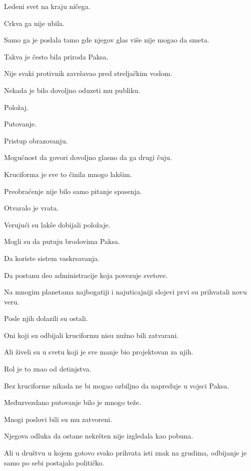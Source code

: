 Ledeni svet na kraju ničega.

Crkva ga nije ubila.

Samo ga je poslala tamo gde njegov glas više nije mogao da smeta.

\bigskip

Takva je često bila priroda Paksa.

Nije svaki protivnik završavao pred streljačkim vodom.

Nekada je bilo dovoljno oduzeti mu publiku.

Položaj.

Putovanje.

Pristup obrazovanju.

Mogućnost da govori dovoljno glasno da ga drugi čuju.

\bigskip

Kruciforma je sve to činila mnogo lakšim.

\bigskip

Preobraćenje nije bilo samo pitanje spasenja.

Otvaralo je vrata.

\bigskip

Verujući su lakše dobijali položaje.

Mogli su da putuju brodovima Paksa.

Da koriste sistem vaskrsavanja.

Da postanu deo administracije koja povezuje svetove.

Na mnogim planetama najbogatiji i najuticajniji slojevi prvi su prihvatali novu veru.

Posle njih dolazili su ostali.

\bigskip

Oni koji su odbijali kruciformu nisu nužno bili zatvarani.

Ali živeli su u svetu koji je sve manje bio projektovan za njih.

\bigskip

Rol je to znao od detinjstva.

Bez kruciforme nikada ne bi mogao ozbiljno da napreduje u vojsci Paksa.

Međuzvezdano putovanje bilo je mnogo teže.

Mnogi poslovi bili su mu zatvoreni.

Njegova odluka da ostane nekršten nije izgledala kao pobuna.

Ali u društvu u kojem gotovo svako prihvata isti znak na grudima, odbijanje je samo po sebi postajalo političko.

